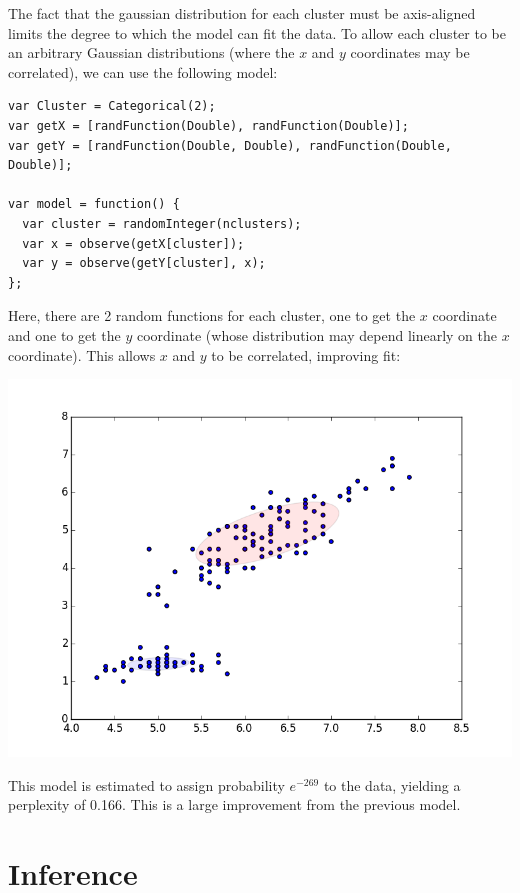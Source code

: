\documentclass{article}
\begin{document}
  The fact that the gaussian distribution for each cluster must be axis-aligned limits the degree to which the model can fit the data.   To allow each cluster to be an arbitrary Gaussian distributions (where the $x$ and $y$ coordinates may be correlated),
  we can use the following model:

\begin{lstlisting}
var Cluster = Categorical(2);
var getX = [randFunction(Double), randFunction(Double)];
var getY = [randFunction(Double, Double), randFunction(Double, Double)];

var model = function() {
  var cluster = randomInteger(nclusters);
  var x = observe(getX[cluster]);
  var y = observe(getY[cluster], x);
};
\end{lstlisting}

  Here, there are 2 random functions for each cluster, one to get the $x$ coordinate and one to get the $y$ coordinate (whose distribution may depend linearly on the $x$ coordinate).  This allows $x$ and $y$ to be correlated, improving fit:

  \begin{center}
    \includegraphics[scale=0.5]{../plots/irisclusters_dep.png}
  \end{center}

  This model is estimated to assign probability $e^{-269}$ to the data, yielding a perplexity of 0.166.  This is a large improvement from the previous model.



  \section{Inference}
\end{document}
